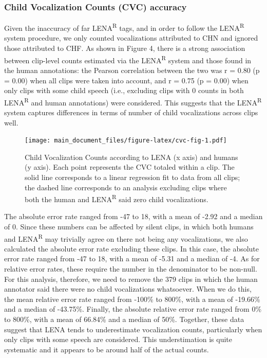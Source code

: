 \documentclass[english,table,man,floatsintext]{apa6}
\begin{document}
\hypertarget{child-vocalization-counts-cvc-accuracy}{%
\subsubsection{Child Vocalization Counts (CVC) accuracy}\label{child-vocalization-counts-cvc-accuracy}}

Given the inaccuracy of far LENA\textsuperscript{R} tags, and in order to follow the LENA\textsuperscript{R} system procedure, we only counted vocalizations attributed to CHN and ignored those attributed to CHF. As shown in Figure 4, there is a strong association between clip-level counts estimated via the LENA\textsuperscript{R} system and those found in the human annotations: the Pearson correlation between the two was r = 0.80 (p = 0.00) when all clips were taken into account, and r = 0.75 (p = 0.00) when only clips with some child speech (i.e., excluding clips with 0 counts in both LENA\textsuperscript{R} and human annotations) were considered. This suggests that the LENA\textsuperscript{R} system captures differences in terms of number of child vocalizations across clips well.

\begin{figure}
\centering
\texttt{[image: main\_document\_files/figure-latex/cvc-fig-1.pdf]}
\caption{\label{fig:cvc-fig}Child Vocalization Counts according to LENA (x axis) and humans (y axis). Each point represents the CVC totaled within a clip. The solid line corresponds to a linear regression fit to data from all clips; the dashed line corresponds to an analysis excluding clips where both the human and LENA\textsuperscript{R} said zero child vocalizations.}
\end{figure}

The absolute error rate ranged from -47 to 18, with a mean of -2.92 and a median of 0. Since these numbers can be affected by silent clips, in which both humans and LENA\textsuperscript{R} may trivially agree on there not being any vocalizations, we also calculated the absolute error rate excluding these clips. In this case, the absolute error rate ranged from -47 to 18, with a mean of -5.31 and a median of -4. As for relative error rates, these require the number in the denominator to be non-null. For this analysis, therefore, we need to remove the 379 clips in which the human annotator said there were no child vocalizations whatsoever. When we do this, the mean relative error rate ranged from -100\% to 800\%, with a mean of -19.66\% and a median of -43.75\%. Finally, the absolute relative error rate ranged from 0\% to 800\%, with a mean of 66.84\% and a median of 50\%. Together, these data suggest that LENA tends to underestimate vocalization counts, particularly when only clips with some speech are considered. This understimation is quite systematic and it appears to be around half of the actual counts.
\end{document}
